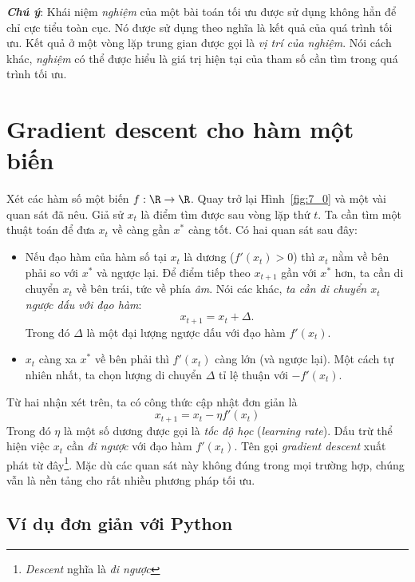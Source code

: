 \textit{\textbf{Chú ý}}: Khái niệm \textit{nghiệm} của một bài toán tối ưu được sử dụng không hẳn để chỉ cực tiểu toàn cục. Nó được sử dụng theo nghĩa là kết quả của quá trình tối ưu. Kết quả ở một vòng lặp trung gian được gọi là \textit{vị trí của nghiệm}. Nói cách khác, \textit{nghiệm} có thể được hiểu là giá trị hiện tại của tham số cần tìm trong quá trình tối ưu. 
 
 
 
\section{Gradient descent cho hàm một biến}
Xét các hàm số một biến $f: \R \rightarrow \R$. Quay trở lại Hình~\ref{fig:7_0}
và một vài quan sát đã nêu. Giả sử  $x_{t}$ là điểm tìm được sau vòng lặp thứ
$t$. Ta cần tìm một thuật toán để đưa $x_{t}$ về càng gần $x^*$ càng tốt. Có hai
quan sát sau đây:
\begin{itemize}
    \item Nếu đạo hàm của hàm số tại $x_{t}$ là dương ($f'(x_{t}) > 0$) thì
    $x_t$ nằm
    về bên phải so với $x^*$ và ngược lại. Để điểm tiếp theo $x_{t+1}$ gần với
    $x^*$ hơn, ta cần di chuyển $x_t$ về bên trái, tức về phía
    \textit{âm}. Nói các khác, \textit{ta cần di chuyển $x_t$ ngược dấu với đạo hàm}:
    \begin{equation} 
    x_{t+1} = x_t + \Delta.
    \end{equation} 
    Trong đó $\Delta$ là một đại lượng ngược dấu với đạo hàm $f'(x_t)$. 
    
    \item $x_t$ càng xa $x^*$ về bên phải thì $f'(x_t)$ càng lớn (và
    ngược lại). Một cách tự nhiên nhất, ta chọn lượng di chuyển $\Delta$ tỉ lệ
    thuận với $-f'(x_t)$.
 \end{itemize} 
Từ hai nhận xét trên, ta có công thức cập nhật đơn giản là
\begin{equation} 
\boxed{
x_{t+1} = x_t - \eta f'(x_t)
}
\end{equation} 
Trong đó $\eta$ là một số dương được gọi là \textit{tốc độ học}
(\textit{learning rate}). Dấu trừ thể hiện việc $x_t$ cần \textit{đi ngược} với
đạo hàm $f'(x_t)$. Tên gọi \textit{gradient descent} xuất phát từ đây\footnote{
\textit{Descent} nghĩa là \textit{đi ngược}}. Mặc dù các quan sát này không đúng
trong mọi trường hợp, chúng vẫn là nền tảng cho rất nhiều phương pháp tối ưu.
 
\subsection{Ví dụ đơn giản với Python}
 
